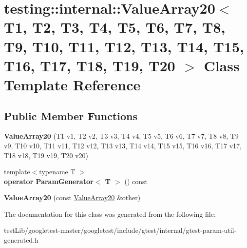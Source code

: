 \hypertarget{classtesting_1_1internal_1_1ValueArray20}{}\section{testing\+:\+:internal\+:\+:Value\+Array20$<$ T1, T2, T3, T4, T5, T6, T7, T8, T9, T10, T11, T12, T13, T14, T15, T16, T17, T18, T19, T20 $>$ Class Template Reference}
\label{classtesting_1_1internal_1_1ValueArray20}
\subsection*{Public Member Functions}
\begin{DoxyCompactItemize}
\item 
\mbox{\label{classtesting_1_1internal_1_1ValueArray20_aafa49e909db9556cdb89692976e80c4a}} 
{\bfseries Value\+Array20} (T1 v1, T2 v2, T3 v3, T4 v4, T5 v5, T6 v6, T7 v7, T8 v8, T9 v9, T10 v10, T11 v11, T12 v12, T13 v13, T14 v14, T15 v15, T16 v16, T17 v17, T18 v18, T19 v19, T20 v20)
\item 
\mbox{\label{classtesting_1_1internal_1_1ValueArray20_abcf63e97d31f62868dab49f1667e9d4f}} 
{\footnotesize template$<$typename T $>$ }\\{\bfseries operator Param\+Generator$<$ T $>$} () const
\item 
\mbox{\label{classtesting_1_1internal_1_1ValueArray20_a965099028a2057212ba388b8017f8e68}} 
{\bfseries Value\+Array20} (const \hyperlink{classtesting_1_1internal_1_1ValueArray20}{Value\+Array20} \&other)
\end{DoxyCompactItemize}


The documentation for this class was generated from the following file\+:\begin{DoxyCompactItemize}
\item 
test\+Lib/googletest-\/master/googletest/include/gtest/internal/gtest-\/param-\/util-\/generated.\+h\end{DoxyCompactItemize}
